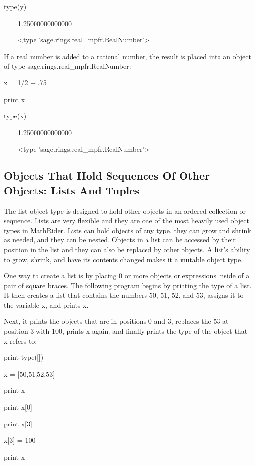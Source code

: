 \documentclass[12pt,oneside]{book}
\begin{document}
type(y)

{\textbar}

\ \ \ \ 1.25000000000000

\ \ \ \ {\textless}type 'sage.rings.real\_mpfr.RealNumber'{\textgreater}

If a real number is added to a rational number, the result is placed into an object of type sage.rings.real\_mpfr.RealNumber: 

x = 1/2 + .75

print x

type(x)

{\textbar}

\ \ \ \ 1.25000000000000

\ \ \ \ {\textless}type 'sage.rings.real\_mpfr.RealNumber'{\textgreater}

\subsection[Objects That Hold Sequences Of Other Objects: Lists And Tuples]{ Objects That Hold Sequences Of Other Objects: Lists And Tuples}

The list object type is designed to hold other objects in an ordered collection or sequence. Lists are very flexible and they are one of the most heavily used object types in MathRider. Lists can hold objects of any type, they can grow and shrink as needed, and they can be nested. Objects in a list can be accessed by their position in the list and they can also be replaced by other objects. A list's ability to grow, shrink, and have its contents changed makes it a mutable object type.

One way to create a list is by placing 0 or more objects or expressions inside of a pair of square braces. The following program begins by printing the type of a list. It then creates a list that contains the numbers 50, 51, 52, and 53, assigns it to the variable x, and prints x.

Next, it prints the objects that are in positions 0 and 3, replaces the 53 at position 3 with 100, prints x again, and finally prints the type of the object that x refers to: 

print type([])

x = [50,51,52,53]

print x

print x[0]

print x[3]

x[3] = 100

print x
\end{document}
